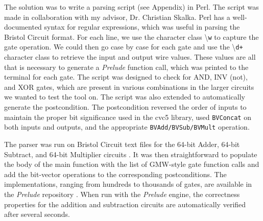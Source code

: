 \documentclass{article}
\begin{document}
The solution was to write a parsing script (see Appendix) in Perl. The script was made in collaboration with my advisor, Dr. Christian Skalka. Perl has a well-documented syntax for regular expressions, which was useful in parsing the Bristol Circuit format. For each line, we use the character class \textbackslash \texttt{w} to capture the gate operation. We could then go case by case for each gate and use the \textbackslash \texttt{d+} character class to retrieve the input and output wire values. These values are all that is necessary to generate a \textit{Prelude} function call, which was printed to the terminal for each gate. The script was designed to check for AND, INV (not), and XOR gates, which are present in various combinations in the larger circuits we wanted to test the tool on. The script was also extended to automatically generate the postcondition. The postcondition reversed the order of inputs to maintain the proper bit significance used in the cvc5 library, used \texttt{BVConcat} on both inputs and outputs, and the appropriate \texttt{BVAdd/BVSub/BVMult} operation.

The parser was run on Bristol Circuit text files for the 64-bit Adder, 64-bit Subtract, and 64-bit Multiplier circuits \cite{bristol}. It was then straightforward to populate the body of the main function with the list of GMW-style gate function calls and add the bit-vector operations to the corresponding postconditions. The implementations, ranging from hundreds to thousands of gates, are available in the \textit{Prelude} repository \cite{prelude-github}. When run with the \textit{Prelude} engine, the correctness properties for the addition and subtraction circuits are automatically verified after several seconds. 
\end{document}
